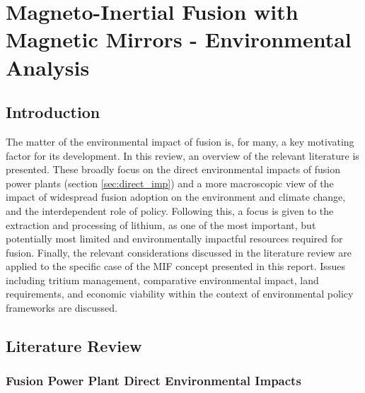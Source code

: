\section{Magneto-Inertial Fusion with Magnetic Mirrors - Environmental Analysis}

\subsection{Introduction}

The matter of the environmental impact of fusion is, for many, a key motivating factor for its development. In this review, an overview of the relevant literature is presented. These broadly focus on the direct environmental impacts of fusion power plants (section \ref{sec:direct_imp}) and a more macroscopic view of the impact of widespread fusion adoption on the environment and climate change, and the interdependent role of policy. Following this, a focus is given to the extraction and processing of lithium, as one of the most important, but potentially most limited and environmentally impactful resources required for fusion. Finally, the relevant considerations discussed in the literature review are applied to the specific case of the MIF concept presented in this report. Issues including tritium management, comparative environmental impact, land requirements, and economic viability within the context of environmental policy frameworks are discussed.

\subsection{Literature Review}

\subsubsection{Fusion Power Plant Direct Environmental Impacts}

